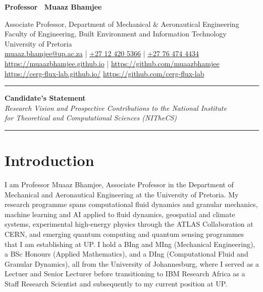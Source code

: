\documentclass[11pt,a4paper]{article}
\begin{document}
{\Large\bfseries Professor \ Muaaz Bhamjee}\\[4pt]
{\normalsize
  Associate Professor, Department of Mechanical \& Aeronautical Engineering\\
  Faculty of Engineering, Built Environment and Information Technology\\ 
  University of Pretoria \\
  \href{mailto:muaaz.bhamjee@up.ac.za}{muaaz.bhamjee@up.ac.za} | \qquad
  \href{Office Contact: +27 12 420 5366}{+27 12 420 5366} | \qquad
  \href{Mobile +27 76 474 4434}{+27 76 474 4434} \\
  \href{URL}{https://muaazbhamjee.github.io} | \qquad
  \href{URL}{https://github.com/muaazbhamjee} \qquad
  \href{URL}{https://cerg-flux-lab.github.io/} \qquad
  \href{URL}{https://github.com/cerg-flux-lab} \qquad

}

\vspace{4pt}
\noindent\color{rulecolour}\rule{\linewidth}{1.5pt}\color{black}

\vspace{6pt}
\begin{center}
  {\large\bfseries Candidate's Statement}\\[3pt]
  {\normalsize\itshape Research Vision and Prospective Contributions to the National Institute\\
  for Theoretical and Computational Sciences (NITheCS)}
\end{center}
\vspace{2pt}
\noindent\color{rulecolour}\rule{\linewidth}{0.5pt}\color{black}
\vspace{6pt}

\section{Introduction}

I am Professor Muaaz Bhamjee, Associate Professor in the Department of Mechanical and Aeronautical Engineering at the University of Pretoria. 
My research programme spans computational fluid dynamics and granular mechanics, machine learning and AI applied to fluid dynamics, geospatial and climate systems, 
experimental high-energy physics through the ATLAS Collaboration at CERN, and emerging quantum computing and quantum sensing programmes that I am establishing at UP. 
I hold a BIng and MIng (Mechanical Engineering), a BSc Honours (Applied Mathematics), and a DIng (Computational Fluid and Granular Dynamics), all from the University of Johannesburg, 
where I served as a Lectuer and Senior Lecturer before transitioning to IBM Research Africa as a Staff Research Scientist and subsequently to my current position at UP.
\end{document}

